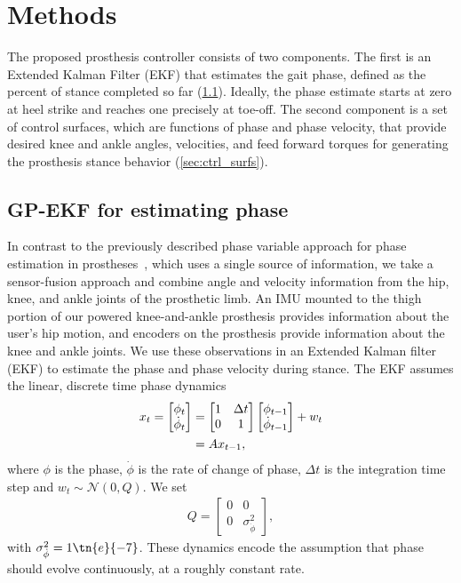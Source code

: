 \section{Methods}\label{sec:phase_est_methods}

The proposed prosthesis controller consists of two components. The first is an
Extended Kalman Filter (EKF) that estimates the gait phase, defined as the
percent of stance completed so far (\cref{sec:gpekf}). Ideally, the phase
estimate starts at zero at heel strike and reaches one precisely at toe-off. The
second component is a set of control surfaces, which are functions of phase and
phase velocity, that provide desired knee and ankle angles, velocities, and feed
forward torques for generating the prosthesis stance behavior
(\cref{sec:ctrl_surfs}).

\subsection{GP-EKF for estimating phase}\label{sec:gpekf}

In contrast to the previously described phase variable approach for phase
estimation in prostheses~\citep{quintero2016preliminary}, which uses a single
source of information, we take a sensor-fusion approach and combine angle and
velocity information from the hip, knee, and ankle joints of the prosthetic
limb.  An IMU mounted to the thigh portion of our powered knee-and-ankle
prosthesis provides information about the user's hip motion, and encoders on the
prosthesis provide information about the knee and ankle joints. We use these
observations in an Extended Kalman filter (EKF) to estimate the phase and phase
velocity during stance. The EKF assumes the linear, discrete time phase dynamics
\begin{align}
    x_t = \begin{bmatrix} \phi_t \\ \dot{\phi}_t \end{bmatrix} 
        &= \begin{bmatrix} 1 & \Delta t \\ 0 & 1 \end{bmatrix} 
            \begin{bmatrix} \phi_{t-1} \\ \dot{\phi}_{t-1} \end{bmatrix} + w_t
            \label{eq:dyn_mdl} \\
        &= A x_{t-1}, \notag
\end{align}
where $\phi$ is the phase, $\dot{\phi}$ is the rate of change of phase, $\Delta
t$ is the integration time step and $w_t \sim \mathcal{N}(0, Q)$. We set
\begin{align}
    Q = \begin{bmatrix} 0 & 0 \\ 0 & \sigma_{\dot{\phi}}^2 \end{bmatrix},
\end{align}
with $\sigma_{\dot{\phi}}^2 = 1\tn{e}{-7}$. These dynamics encode the
assumption that phase should evolve continuously, at a roughly constant rate.

